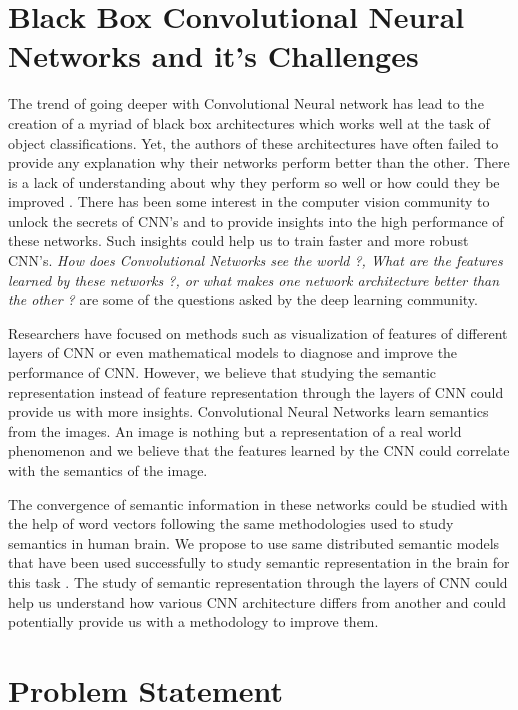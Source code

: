 \section{Black Box Convolutional Neural Networks and it's Challenges}

The trend of going deeper with Convolutional Neural network has lead to the creation of a myriad of black box architectures which works well at the task of object classifications. Yet, the authors of these architectures have often failed to provide any explanation why their networks perform better than the other. There is a lack of understanding about why they perform so well or how could they be improved \cite{CNNVisual1}. There has been some interest in the computer vision community to unlock the secrets of CNN's and to provide insights into the high performance of these networks. Such insights could help us to train faster and more robust CNN's. \textit{How does Convolutional Networks see the world ?, What are the features learned by these networks ?, or what makes one network architecture better than the other ?} are some of the questions asked by the deep learning community.

Researchers have focused on methods such as visualization of features of different layers of CNN \cite{CNNVisual1, CNNVisual2, CNNVisual3} or even mathematical models \cite{CNNVisual4} to diagnose and improve the performance of CNN. However, we believe that studying the semantic representation instead of feature representation through the layers of CNN could provide us with more insights. Convolutional Neural Networks learn semantics from the images. An image is nothing but a representation of a real world phenomenon and we believe that the features learned by the CNN could correlate with the semantics of the image.
  

The convergence of semantic information in these networks could be studied with the help of word vectors following the same methodologies used to study semantics in human brain. We propose to use same distributed semantic models that have been used successfully to study semantic representation in the brain for this task \cite{Mitchell1191, MurphyEEG, SUDRE2012451}. The study of semantic representation through the layers of CNN could help us understand how various CNN architecture differs from another and could potentially provide us with a methodology to improve them.


\section{Problem Statement}

